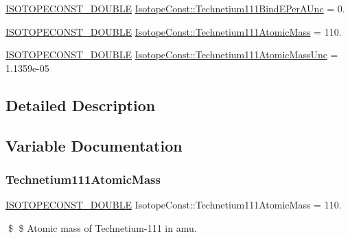 \begin{DoxyCompactItemize}
\item 
\mbox{\hyperlink{group___isotope_const-_macros_ga8f45a7272ce02c0b4c65c44636ed719a}{I\+S\+O\+T\+O\+P\+E\+C\+O\+N\+S\+T\+\_\+\+D\+O\+U\+B\+LE}} \mbox{\hyperlink{group___isotope_const-_technetium-_tc111_ga82ca0db855f1d230e7d596865fe5a1f1}{Isotope\+Const\+::\+Technetium111\+Bind\+E\+Per\+A\+Unc}} = 0.
\item 
\mbox{\hyperlink{group___isotope_const-_macros_ga8f45a7272ce02c0b4c65c44636ed719a}{I\+S\+O\+T\+O\+P\+E\+C\+O\+N\+S\+T\+\_\+\+D\+O\+U\+B\+LE}} \mbox{\hyperlink{group___isotope_const-_technetium-_tc111_gaaef105564a2abac5f6f4ee3d8ae61035}{Isotope\+Const\+::\+Technetium111\+Atomic\+Mass}} = 110.
\item 
\mbox{\hyperlink{group___isotope_const-_macros_ga8f45a7272ce02c0b4c65c44636ed719a}{I\+S\+O\+T\+O\+P\+E\+C\+O\+N\+S\+T\+\_\+\+D\+O\+U\+B\+LE}} \mbox{\hyperlink{group___isotope_const-_technetium-_tc111_ga0bb5fbc1b3fd27e653b8ed1424948f05}{Isotope\+Const\+::\+Technetium111\+Atomic\+Mass\+Unc}} = 1.\+1359e-\/05
\end{DoxyCompactItemize}


\subsection{Detailed Description}


\subsection{Variable Documentation}
\mbox{\label{group___isotope_const-_technetium-_tc111_gaaef105564a2abac5f6f4ee3d8ae61035}} 
\subsubsection{\texorpdfstring{Technetium111\+Atomic\+Mass}{Technetium111AtomicMass}}
{\footnotesize\ttfamily \mbox{\hyperlink{group___isotope_const-_macros_ga8f45a7272ce02c0b4c65c44636ed719a}{I\+S\+O\+T\+O\+P\+E\+C\+O\+N\+S\+T\+\_\+\+D\+O\+U\+B\+LE}} Isotope\+Const\+::\+Technetium111\+Atomic\+Mass = 110.}

\$ \$ Atomic mass of Technetium-\/111 in amu. \mbox{\label{group___isotope_const-_technetium-_tc111_ga0bb5fbc1b3fd27e653b8ed1424948f05}} 

